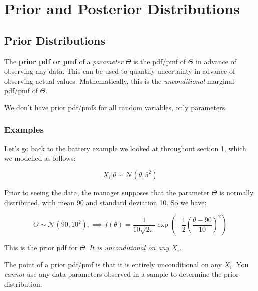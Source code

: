 \documentclass[a4paper]{article}
\begin{document}
    \newpage
    \section{Prior and Posterior Distributions}
        \subsection{Prior Distributions}
            \begin{fread}
                [DS12, section 7.2]
            \end{fread}

            \begin{definition}
                The \textbf{prior pdf or pmf} of a \textit{parameter} $\Theta$
                is the pdf/pmf of $\Theta$ in advance of observing any data.
                This can be used to quantify uncertainty in advance of observing
                actual values. Mathematically, this is the
                \textit{unconditional} marginal pdf/pmf of $\Theta$.

                We don't have prior pdf/pmfs for all random variables, only
                parameters.
            \end{definition}

            \subsubsection{Examples}

                Let's go back to the battery example we looked at throughout
                section 1, which we modelled as follows:

                \[
                    X_i | \theta \sim \mathcal{N}(\theta, 5^2)
                \]

                Prior to seeing the data, the manager supposes that the
                parameter $\Theta$ is normally distributed, with mean 90 and
                standard deviation 10. So we have:

                \[
                    \Theta \sim \mathcal{N}(90, 10^2), \implies f(\theta) =
                    \frac{1}{10\sqrt{2\pi}} \exp{\left(-\frac{1}{2}\left(
                    \frac{\theta - 90}{10}\right)^2\right)}
                \]

                This is the prior pdf for $\Theta$. \textit{It is unconditional
                on any $X_i$.}

                \begin{warn}
                    The point of a prior pdf/pmf is that it is entirely
                    unconditional on any $X_i$. You \textit{cannot} use any data
                    parameters observed in a sample to determine the prior
                    distribution.
                \end{warn}
\end{document}
